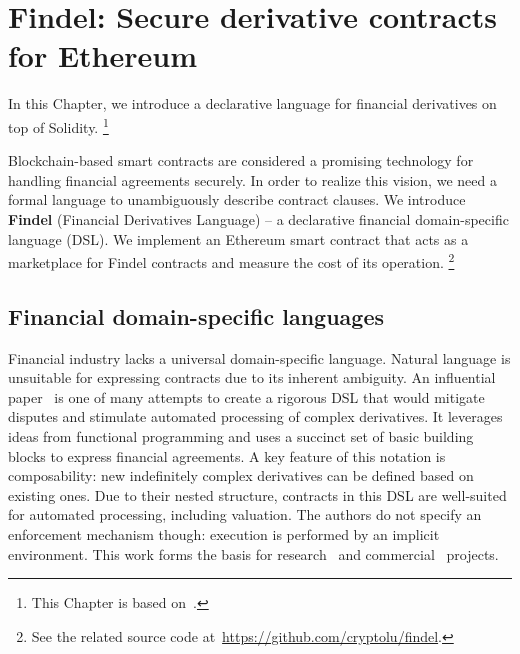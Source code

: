\chapter{Findel: Secure derivative contracts for Ethereum}

\label{Chapter10Findel}

In this Chapter, we introduce a declarative language for financial derivatives on top of Solidity.
\footnote{This Chapter is based on~\cite{Biryukov2017}.}

Blockchain-based smart contracts are considered a promising technology for handling financial agreements securely.
In order to realize this vision, we need a formal language to unambiguously describe contract clauses.
We introduce \textbf{Findel} (Financial Derivatives Language) -- a declarative financial domain-specific language (DSL).
We implement an Ethereum smart contract that acts as a marketplace for Findel contracts and measure the cost of its operation.
\footnote{See the related source code at~\url{https://github.com/cryptolu/findel}.}


\section{Financial domain-specific languages}

Financial industry lacks a universal domain-specific language.
Natural language is unsuitable for expressing contracts due to its inherent ambiguity.
An influential paper~\cite{PeytonJones2000} is one of many attempts to create a rigorous DSL that would mitigate disputes and stimulate automated processing of complex derivatives.
It leverages ideas from functional programming and uses a succinct set of basic building blocks to express financial agreements.
A key feature of this notation is composability: new indefinitely complex derivatives can be defined based on existing ones.
Due to their nested structure, contracts in this DSL are well-suited for automated processing, including valuation.
The authors do not specify an enforcement mechanism though: execution is performed by an implicit environment.
This work forms the basis for research~\cite{Gaillourdet2011, Schuldenzucker2014} and commercial~\cite{Frankau2009} projects.

